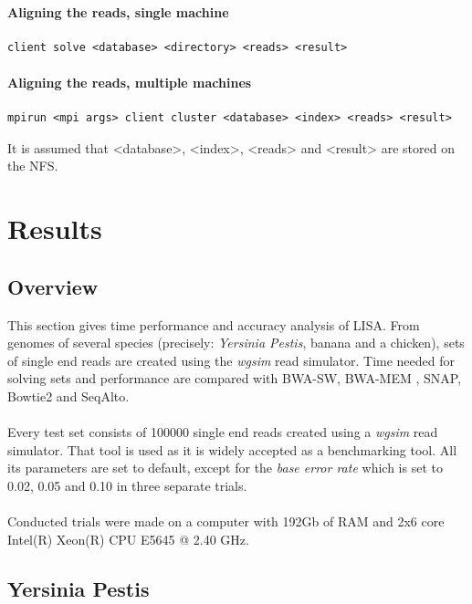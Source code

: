 \documentclass[times, utf8, diplomski]{fer}
\begin{document}
\subsubsection{Aligning the reads, single machine}
\begin{lstlisting}
client solve <database> <directory> <reads> <result>
\end{lstlisting}

\subsubsection{Aligning the reads, multiple machines}
\begin{lstlisting}
mpirun <mpi args> client cluster <database> <index> <reads> <result>
\end{lstlisting}
It is assumed that <database>, <index>, <reads> and <result> are stored on the NFS.

\chapter{Results}
\section{Overview}
This section gives time performance and accuracy analysis of LISA. From genomes of several species (precisely: \emph{Yersinia Pestis}, banana and a chicken), sets of single end reads are created using the \emph{wgsim}\cite{wgsim} read simulator. Time needed for solving sets and performance are compared with BWA-SW, BWA-MEM \cite{Li:2010:FAL:1741823.1741825}, SNAP, Bowtie2\cite{langmeadfast2012} and SeqAlto.\\
\\
Every test set consists of 100000 single end reads created using a \emph{wgsim} read simulator. That tool is used as it is widely accepted as a benchmarking tool. All its parameters are set to default, except for the \emph{base error rate} which is set to 0.02, 0.05 and 0.10 in three separate trials.\\
\\
Conducted trials were made on a computer with 192Gb of RAM and 2x6 core Intel(R) Xeon(R) CPU E5645 @ 2.40 GHz.


\section{Yersinia Pestis}
\end{document}
